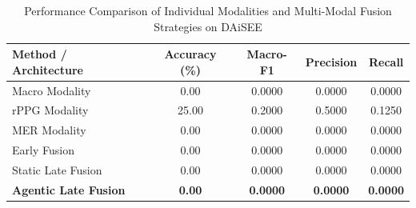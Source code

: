\begin{table}[htbp]
\centering
\caption{Performance Comparison of Individual Modalities and Multi-Modal Fusion Strategies on DAiSEE}
\label{tab:engagement_results}
\begin{tabular}{lcccc}
\hline
\textbf{Method / Architecture} & \textbf{Accuracy (\%)} & \textbf{Macro-F1} & \textbf{Precision} & \textbf{Recall} \\
\hline
Macro Modality & 0.00 & 0.0000 & 0.0000 & 0.0000 \\
rPPG Modality & 25.00 & 0.2000 & 0.5000 & 0.1250 \\
MER Modality & 0.00 & 0.0000 & 0.0000 & 0.0000 \\
Early Fusion & 0.00 & 0.0000 & 0.0000 & 0.0000 \\
Static Late Fusion & 0.00 & 0.0000 & 0.0000 & 0.0000 \\
\textbf{Agentic Late Fusion} & \textbf{0.00} & \textbf{0.0000} & \textbf{0.0000} & \textbf{0.0000} \\
\hline
\end{tabular}
\end{table}
